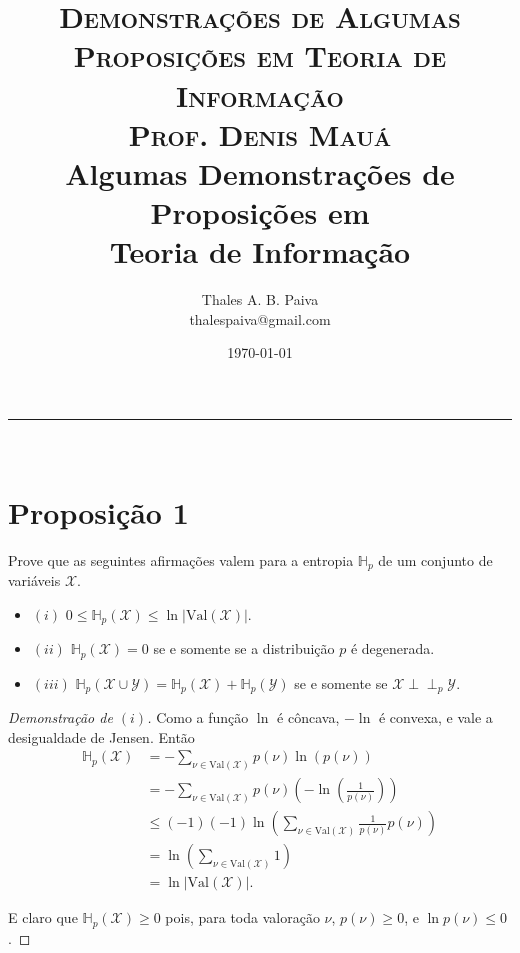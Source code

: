 \documentclass[paper=a4, fontsize=11pt]{scrartcl} %
\title{	
\normalfont \normalsize 
\textsc{Demonstrações de Algumas Proposições em Teoria de Informação} \\ 
\textsc{Prof. Denis Mauá} \\ [25pt]
\huge Algumas Demonstrações de \\ Proposições em \\Teoria de Informação \\ [25pt]
}
\author{Thales A. B. Paiva \\ thalespaiva@gmail.com} %
\date{\today} %
\numberwithin{equation}{subsection}
\numberwithin{figure}{subsection}
\numberwithin{table}{subsection}
\numberwithin{definition}{subsection}
\numberwithin{theorem}{subsection}
\numberwithin{property}{subsection}
\numberwithin{proposition}{subsection}
\numberwithin{equation}{section}
\numberwithin{figure}{section}
\numberwithin{table}{section}
\numberwithin{definition}{section}
\numberwithin{theorem}{section}
\numberwithin{property}{section}
\numberwithin{proposition}{section}
\def\ind{\perp\!\!\!\perp}
\newcommand{\horrule}[1]{\rule{\linewidth}{#1}} %
\newcommand{\set}[1]{\mathcal{#1}}
\newcommand{\entp}{\ensuremath{\mathbb{H}_p}\xspace}
\newcommand{\varset}{\ensuremath{\mathcal{X}}\xspace}
\newcommand{\val}{\ensuremath{\text{Val}}\xspace}
\begin{document}
\maketitle %
\horrule{1pt} \\[0.5cm] %

\tableofcontents

\pagebreak
\section{Proposição 1}

Prove que as seguintes afirmações valem para a entropia \entp de um conjunto de variáveis \varset.
\begin{itemize}
  \item[]  $(i)$ $0 \leq \entp(\varset) \leq \ln | \val(\varset) |$.
  \item[]  $(ii)$ $\entp(\varset) = 0 $ se e somente se a distribuição $p$ é degenerada.
  \item[]  $(iii)$ $\entp(\set{X} \cup \set{Y}) = \entp(\set{X}) + \entp(\set{Y})$ se e somente se
           $\set{X} \ind_p \set{Y}$.
\end{itemize}


\begin{proof}[Demonstração de $(i)$]

Como a função $\ln$ é côncava, $-\ln$ é convexa, e vale a desigualdade de Jensen. Então
\begin{align*}
\entp(\varset) 
  &= - \sum_{\nu \in \val(\varset)} p(\nu) \ln \left({p(\nu)} \right) \\
  &= - \sum_{\nu \in \val(\varset)} p(\nu) \left( - \ln \left( \frac{1}{p(\nu)} \right) \right) \\
  &\leq (-1)(-1) \ln \left(\sum_{\nu \in \val(\varset)} \frac{1}{p(\nu)} p(\nu) \right) \\
  &= \ln \left(\sum_{\nu \in \val(\varset)} 1 \right) \\
  &= \ln | \val(\varset) |.
\end{align*}
 
E claro que $\entp(\varset) \geq 0$ pois, para toda valoração $\nu$, $p(\nu) \geq 0$, e $\ln p(\nu) \leq 0$. 

\end{proof}
\end{document}
